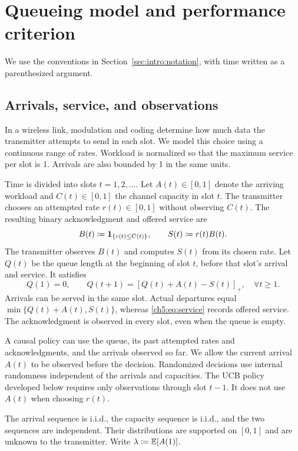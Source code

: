 \section{Queueing model and performance criterion}
\label{ch5:sec:model}

We use the conventions in Section~\ref{sec:intro:notation}, with time
written as a parenthesized argument.

\subsection{Arrivals, service, and observations}

In a wireless link, modulation and coding determine how much data the
transmitter attempts to send in each slot. We model this choice using a
continuous range of rates. Workload is normalized so that the maximum
service per slot is 1. Arrivals are also bounded by 1 in the same units.

Time is divided into slots $t=1,2,\ldots$. Let $A(t)\in[0,1]$ denote the
arriving workload and $C(t)\in[0,1]$ the channel capacity in slot $t$.
The transmitter chooses an attempted rate $r(t)\in[0,1]$ without observing
$C(t)$. The resulting binary acknowledgment and offered service are
\begin{equation}
 B(t)\coloneqq\mathbf{1}_{\{r(t)\le C(t)\}},
 \qquad S(t)\coloneqq r(t)B(t).
 \label{ch5:eq:service}
\end{equation}
The transmitter observes $B(t)$ and computes $S(t)$ from its chosen rate.
Let $Q(t)$ be the queue length at the beginning of slot $t$, before that
slot's arrival and service. It satisfies
\begin{equation}
 Q(1)=0,\qquad
 Q(t+1)=[Q(t)+A(t)-S(t)]_+, \quad\forall t\ge1.
 \label{ch5:eq:queue}
\end{equation}
Arrivals can be served in the same slot. Actual departures equal
$\min\{Q(t)+A(t),S(t)\}$, whereas \eqref{ch5:eq:service} records offered
service. The acknowledgment is observed in every slot, even when the queue
is empty.

A causal policy can use the queue, its past attempted rates and
acknowledgments, and the arrivals observed so far. We allow the current
arrival $A(t)$ to be observed before the decision. Randomized decisions
use internal randomness independent of the arrivals and capacities.
The UCB policy developed below requires only observations through slot
$t-1$. It does not use $A(t)$ when choosing $r(t)$.

\begin{Thm:Assumption}
\label{ch5:ass:environment}
The arrival sequence is i.i.d., the capacity sequence is i.i.d., and the
two sequences are independent. Their distributions are supported on
$[0,1]$ and are unknown to the transmitter. Write
$\lambda\coloneqq\mathbb{E}[A(1)]$.
\end{Thm:Assumption}


